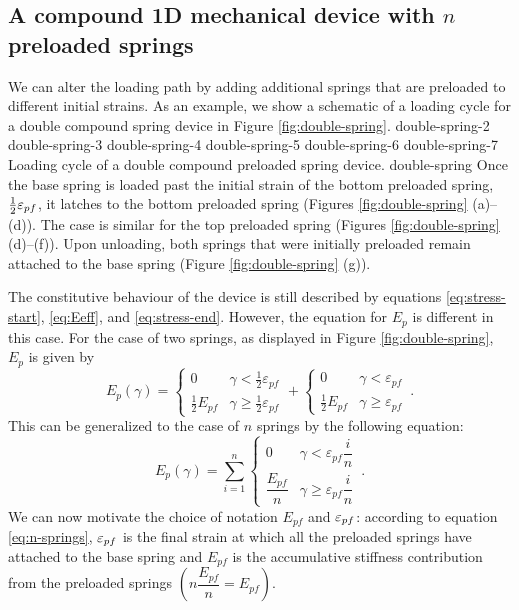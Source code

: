 \documentclass{article}
\begin{document}
\subsection{A compound 1D mechanical device with $n$ preloaded springs}
We can alter the loading path by adding additional springs that are preloaded to different initial strains. As an example, we show a schematic of a loading cycle for a double compound spring device in Figure \ref{fig:double-spring}. 
{double-spring-2}
{double-spring-3}
{double-spring-4}
{double-spring-5}
{double-spring-6}
{double-spring-7}
{Loading cycle of a double compound preloaded spring device.}
{double-spring}
Once the base spring is loaded past the initial strain of the bottom preloaded spring, $\tfrac{1}{2}\varepsilon_{pf}$, it latches to the bottom preloaded spring (Figures \ref{fig:double-spring} (a)--(d)). The case is similar for the top preloaded spring (Figures \ref{fig:double-spring} (d)--(f)). Upon unloading, both springs that were initially preloaded remain attached to the base spring (Figure \ref{fig:double-spring} (g)). 

The constitutive behaviour of the device is still described by equations \eqref{eq:stress-start}, \eqref{eq:Eeff}, and \eqref{eq:stress-end}. However, the equation for $E_p$ is different in this case. For the case of two springs, as displayed in Figure \ref{fig:double-spring}, $E_p$ is given by
\begin{equation}
	E_p\left(\gamma\right) = \begin{cases}
		0 & \gamma < \tfrac{1}{2} \varepsilon_{pf} \\
		\tfrac{1}{2}E_{pf} & \gamma \geq \tfrac{1}{2} \varepsilon_{pf}
	\end{cases} + \begin{cases}
	0 & \gamma <  \varepsilon_{pf} \\
	\tfrac{1}{2}E_{pf} & \gamma \geq  \varepsilon_{pf}
\end{cases}\,.
\end{equation}
This can be generalized to the case of $n$ springs by the following equation:
\begin{equation}
	E_p\left(\gamma\right) = \sum_{i=1}^{n}\begin{cases}
		0 & \gamma < \varepsilon_{pf}\dfrac{i}{n} \\
		\dfrac{E_{pf}}{n} & \gamma \geq \varepsilon_{pf}\dfrac{i}{n}
	\end{cases}\,.
\label{eq:n-springs}
\end{equation}
We can now motivate the choice of notation $E_{pf}$ and $\varepsilon_{pf}$: according to equation \eqref{eq:n-springs}, $\varepsilon_{pf}$ is the final strain at which all the preloaded springs have attached to the base spring and $E_{pf}$ is the accumulative stiffness contribution from the preloaded springs $\left(n\dfrac{E_{pf}}{n}=E_{pf}\right)$.
\end{document}
